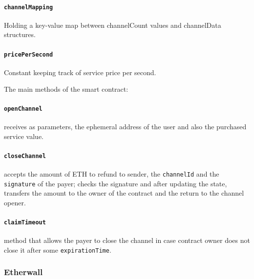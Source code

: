 \documentclass[12pt]{amsart}
\begin{document}
\begin{multicols}{2}
\vspace{0.35cm}

\paragraph{\texttt{channelMapping}} Holding a key-value map between
channelCount values and channelData structures.

\vspace{0.35cm}

\paragraph{\texttt{pricePerSecond}} Constant keeping track of
service price per second.

\vspace{0.35cm}

The main methods of the smart contract:

\vspace{0.35cm}

\paragraph{\texttt{openChannel}} receives as parameters, the ephemeral address
of the user and also the purchased service value.

\vspace{0.35cm}

\paragraph{\texttt{closeChannel}} accepts the amount of ETH to refund
to sender, the \texttt{channelId} and the \texttt{signature} of the
payer; checks the signature and after updating the state, transfers
the amount to the owner of the contract and the return to the channel
opener.

\vspace{0.35cm}


\paragraph{\texttt{claimTimeout}} method that allows the payer to
close the channel in case contract owner does not close it after
some \texttt{expirationTime}.

\subsubsection{Etherwall}


\end{multicols}
\end{document}
